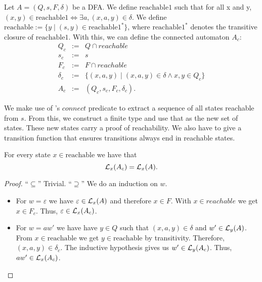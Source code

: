 \begin{definition}
    \label{A_c}
    Let $A = (Q, s, F, \delta)$ be a DFA.
    We define $\mathrm{reachable1}$ such that for all x and y, 
    $(x,y) \in \mathrm{reachable1} \iff \exists a, (x,a,y) \in \delta$.
    We define $\mathrm{reachable} := \{y \; | \; (s,y) \in \mathrm{reachable1}^*\}$, 
    where $\mathrm{reachable1}^*$ denotes the transitive closure of $\mathrm{reachable1}$.
    With this, we can define the connected automaton $A_c$:
    \begin{eqnarray*}
        Q_c & := & Q \cap reachable \\
        s_c & := & s \\
        F_c & := & F \cap reachable \\
        \delta_c & := & \{(x, a, y) \; | \; (x, a, y) \in \delta \wedge x,y \in Q_c \} \\
        A_c &:=& (Q_c, s_c, F_c, \delta_c).
    \end{eqnarray*}
\end{definition}


We make use of \ssreflect's $connect$ predicate to extract a sequence of all states reachable from $s$. 
From this, we construct a finite type and use that as the new set of states. 
These new states carry a proof of reachability. %
We also have to give a transition function that ensures transitions always end in reachable states.



\begin{lemma}
    \label{dfa_connected_correct'}
    For every state $x \in \mathrm{reachable}$ we have that
    \begin{equation*}
        \mathcal{L}_{x}(A_c) = \mathcal{L}_{x}(A).
    \end{equation*}
\end{lemma}
\begin{proof}
    ``$\subseteq$'' Trivial.
    ``$\supseteq$''
    We do an induction on $w$.
    \begin{itemize}
        \item
            For $w = \varepsilon$ we have $\varepsilon \in \mathcal{L}_{x}(A)$ and therefore $x \in F$. 
            With $x \in reachable$ we get $x \in F_c$. 
            Thus, $\varepsilon \in \mathcal{L}_{x}(A_c)$.
        \item
            For $w = a w'$ we have have $y \in Q$ such that $(x, a, y) \in \delta$ and $w' \in \mathcal{L}_{y}(A)$.
            From $x \in \mathrm{reachable}$ we get $y \in \mathrm{reachable}$ by transitivity.
            Therefore, $(x,a,y) \in \delta_c$.
            The inductive hypothesis gives us $w' \in \mathcal{L}_{y}(A_c)$. 
            Thus, $a w' \in \mathcal{L}_{x}(A_c)$.
    \end{itemize}
\end{proof}

